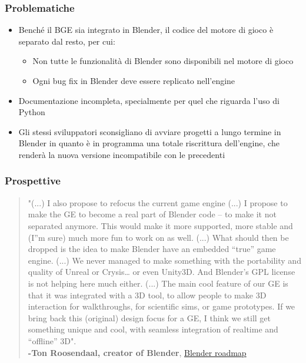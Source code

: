 \documentclass{beamer}
\begin{document}
		\begin{frame}
			\frametitle{Problematiche}
			\begin{itemize}
				\item Benché il BGE sia integrato in Blender, il codice del motore di gioco è separato dal resto, per cui:
				\begin{itemize}
					\item Non tutte le funzionalità di Blender sono disponibili nel motore di gioco
					\item Ogni bug fix in Blender deve essere replicato nell'engine
				\end{itemize}
				\item Documentazione incompleta, specialmente per quel che riguarda l'uso di Python
				\item Gli stessi sviluppatori sconsigliano di avviare progetti a lungo termine in Blender in quanto è in programma una totale riscrittura dell'engine, che renderà la nuova versione incompatibile con le precedenti
			\end{itemize}
		\end{frame}
		\begin{frame}
			\frametitle{Prospettive}
			\begin{quotation}\small 
				"(...) I also propose to refocus the current game engine (...) I propose to make the GE to become a real part of Blender code – to make it not separated anymore. This would make it more supported, more stable and (I”m sure) much more fun to work on as well. (...) What should then be dropped is the idea to make Blender have an embedded “true” game engine. (...) We never managed to make something with the portability and quality of Unreal or Crysis… or even Unity3D. And Blender's GPL license is not helping here much either. (...) The main cool feature of our GE is that it was integrated with a 3D tool, to allow people to make 3D interaction for walkthroughs, for scientific sims, or game prototypes. If we bring back this (original) design focus for a GE, I think we still get something unique and cool, with seamless integration of realtime and “offline” 3D". 
				\\ \textcolor{BlenderOrange}{\textbf{-Ton Roosendaal, creator of Blender}, \href{https://code.blender.org/2013/06/blender-roadmap-2-7-2-8-and-beyond/}{Blender roadmap}} 
			\end{quotation} 
		\end{frame}
\end{document}
